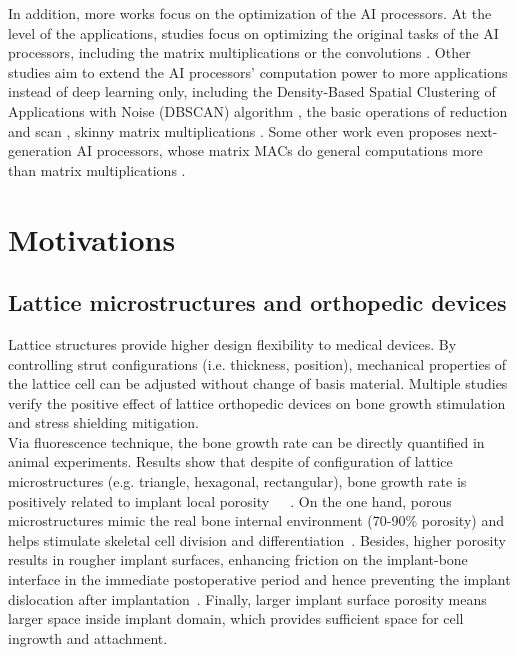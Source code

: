 \documentclass[12pt]{extbook}
\begin{document}
In addition, more works focus on the optimization of the AI processors. At the level of the applications, studies focus on optimizing the original tasks of the AI processors, including the matrix multiplications \cite{DBLP:conf/ipps/00020C20} or the convolutions \cite{DBLP:conf/ppopp/YanWC20}. Other studies aim to extend the AI processors' computation power to more applications instead of deep learning only, including the Density-Based Spatial Clustering of Applications with Noise (DBSCAN) algorithm \cite{DBLP:conf/icpp/JiW21}, the basic operations of reduction and scan \cite{DBLP:conf/sccc/CarrascoVN18, DBLP:conf/ics/DakkakLXGH19}, skinny matrix multiplications \cite{DBLP:conf/ic-nc/TangK0K20}. Some other work even proposes next-generation AI processors, whose matrix MACs do general computations more than matrix multiplications \cite{10.1145/3470496.3527411}.

\section{Motivations}
\label{intro_moti}

\subsection{Lattice microstructures and orthopedic devices}

Lattice structures provide higher design flexibility to medical devices. By controlling strut configurations (i.e. thickness, position), mechanical properties of the lattice cell can be adjusted without change of basis material. Multiple studies verify the positive effect of lattice orthopedic devices on bone growth stimulation and stress shielding mitigation.\\

Via fluorescence technique, the bone growth rate can be directly quantified in animal experiments. Results show that despite of configuration of lattice microstructures (e.g. triangle, hexagonal, rectangular), bone growth rate is positively related to implant local porosity~\cite{cheng2014additively}~\cite{van2012effect}~\cite{li2007bone}. On the one hand, porous microstructures mimic the real bone internal environment (70-90\% porosity) and helps stimulate skeletal cell division and differentiation~\cite{balla2010porous}. Besides, higher porosity results in rougher implant surfaces, enhancing friction on the implant-bone interface in the immediate postoperative period and hence preventing the implant dislocation after implantation~\cite{xue2007processing}. Finally, larger implant surface porosity means larger space inside implant domain, which provides sufficient space for cell ingrowth and attachment.\\
\end{document}
